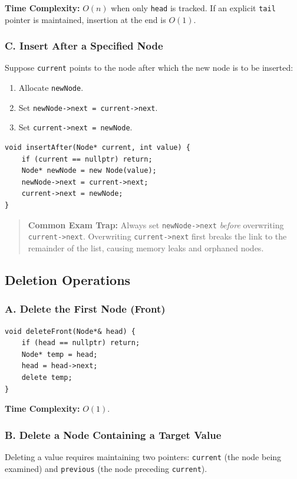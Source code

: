 \textbf{Time Complexity:} $O(n)$ when only \texttt{head} is tracked. If an explicit \texttt{tail} pointer is maintained, insertion at the end is $O(1)$.

\subsubsection{C. Insert After a Specified Node}
Suppose \texttt{current} points to the node after which the new node is to be inserted:
\begin{enumerate}
    \item Allocate \texttt{newNode}.
    \item Set \texttt{newNode->next = current->next}.
    \item Set \texttt{current->next = newNode}.
\end{enumerate}

\begin{lstlisting}[style=cppstyle]
void insertAfter(Node* current, int value) {
    if (current == nullptr) return;
    Node* newNode = new Node(value);
    newNode->next = current->next;
    current->next = newNode;
}
\end{lstlisting}

\begin{quote}
\textbf{Common Exam Trap:} Always set \texttt{newNode->next} \emph{before} overwriting \texttt{current->next}. Overwriting \texttt{current->next} first breaks the link to the remainder of the list, causing memory leaks and orphaned nodes.
\end{quote}

\subsection{Deletion Operations}

\subsubsection{A. Delete the First Node (Front)}
\begin{lstlisting}[style=cppstyle]
void deleteFront(Node*& head) {
    if (head == nullptr) return;
    Node* temp = head;
    head = head->next;
    delete temp;
}
\end{lstlisting}
\textbf{Time Complexity:} $O(1)$.

\subsubsection{B. Delete a Node Containing a Target Value}
Deleting a value requires maintaining two pointers: \texttt{current} (the node being examined) and \texttt{previous} (the node preceding \texttt{current}).

